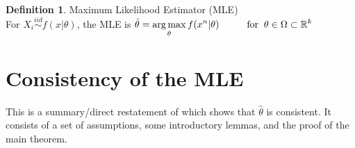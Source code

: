 \documentclass[letterpaper,11pt]{article}
\newcommand{\R}{\mathbb{R}}
\DeclareMathOperator*{\argmax}{arg\,max}
\theoremstyle{definition}
\newcounter{def}
\newtheorem*{defn}{Definition}
\begin{document}
\begin{defn}{Maximum Likelihood Estimator (MLE)}\\
For $X_i \overset{iid}{\sim} f(x|\theta)$, the MLE is 
$\displaystyle\hat\theta = \argmax_\theta f(x^n|\theta) \text{\hspace{1cm}for}\;\; \theta\in\Omega\subset \R^k$
\end{defn}

\section{Consistency of the MLE}
This is a summary/direct restatement of \citet{waldNoteConsistencyMaximum1949} which shows that $\hat\theta$ is consistent. It consists of a set of assumptions, some introductory lemmas, and the proof of the main theorem.
\end{document}

